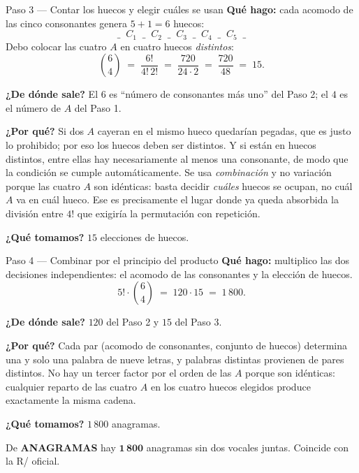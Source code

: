 \documentclass[11pt]{article}
\begin{document}
\begin{paso}{Paso 3 --- Contar los huecos y elegir cuáles se usan}
\textbf{Qué hago:} cada acomodo de las cinco consonantes genera $5+1=6$ huecos:
\[
\_\;\;C_1\;\;\_\;\;C_2\;\;\_\;\;C_3\;\;\_\;\;C_4\;\;\_\;\;C_5\;\;\_
\]
Debo colocar las cuatro $A$ en cuatro huecos \emph{distintos}:
\[
\binom{6}{4} \;=\; \frac{6!}{4!\,2!} \;=\; \frac{720}{24\cdot 2} \;=\; \frac{720}{48} \;=\; 15.
\]

\textbf{¿De dónde sale?} El $6$ es ``número de consonantes más uno'' del Paso 2; el $4$ es el número de $A$
del Paso 1.

\textbf{¿Por qué?} Si dos $A$ cayeran en el mismo hueco quedarían pegadas, que es justo lo prohibido; por eso
los huecos deben ser distintos. Y si están en huecos distintos, entre ellas hay necesariamente al menos una
consonante, de modo que la condición se cumple automáticamente. Se usa \emph{combinación} y no variación
porque las cuatro $A$ son idénticas: basta decidir \emph{cuáles} huecos se ocupan, no cuál $A$ va en cuál
hueco. Ese es precisamente el lugar donde ya queda absorbida la división entre $4!$ que exigiría la
permutación con repetición.

\textbf{¿Qué tomamos?} $15$ elecciones de huecos.
\end{paso}

\begin{paso}{Paso 4 --- Combinar por el principio del producto}
\textbf{Qué hago:} multiplico las dos decisiones independientes: el acomodo de las consonantes y la elección
de huecos.
\[
5!\cdot\binom{6}{4} \;=\; 120\cdot 15 \;=\; 1\,800.
\]

\textbf{¿De dónde sale?} $120$ del Paso 2 y $15$ del Paso 3.

\textbf{¿Por qué?} Cada par (acomodo de consonantes, conjunto de huecos) determina una y solo una palabra de
nueve letras, y palabras distintas provienen de pares distintos. No hay un tercer factor por el orden de las
$A$ porque son idénticas: cualquier reparto de las cuatro $A$ en los cuatro huecos elegidos produce
exactamente la misma cadena.

\textbf{¿Qué tomamos?} $1\,800$ anagramas.
\end{paso}

\begin{resp}
De \textbf{ANAGRAMAS} hay $\mathbf{1\,800}$ anagramas sin dos vocales juntas. Coincide con la R/ oficial.
\end{resp}

\end{document}
